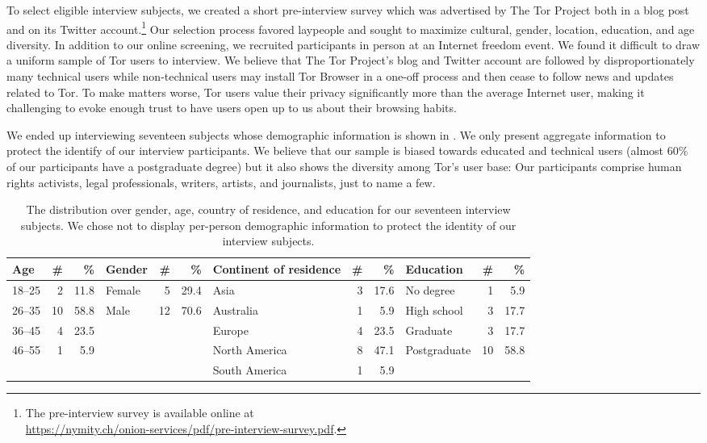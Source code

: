 To select eligible interview subjects, we created a short pre-interview survey
which was advertised by The Tor Project both in a blog post~\cite{Winter2017a}
and on its Twitter account.\footnote{The pre-interview survey is available
online at\\\url{https://nymity.ch/onion-services/pdf/pre-interview-survey.pdf}.}
Our selection process favored laypeople and sought to maximize cultural, gender,
location, education, and age diversity.  In addition to our online screening, we
recruited participants in person at an Internet freedom event.  We found it
difficult to draw a uniform sample of Tor users to interview. We believe that
The Tor Project's blog and Twitter account are followed by disproportionately
many technical users while non-technical users may install Tor Browser in a
one-off process and then cease to follow news and updates related to Tor.  To
make matters worse, Tor users value their privacy significantly more than the
average Internet user, making it challenging to evoke enough trust to have users
open up to us about their browsing habits.

We ended up interviewing seventeen subjects whose demographic information is
shown in .  We only present aggregate information to
protect the identify of our interview participants.  We believe that our sample
is biased towards educated and technical users (almost 60\% of our participants
have a postgraduate degree) but it also shows the diversity among Tor's user
base: Our participants comprise human rights activists, legal professionals,
writers, artists, and journalists, just to name a few.

\begin{table*}[ht]
	\centering
	\caption{The distribution over gender, age, country of residence, and
	education for our seventeen interview subjects.  We chose not to display
	per-person demographic information to protect the identity of our interview
	subjects.}
	\label{tab:interviewees}
	\begin{tabular}{l r r | l r r | l r r | l r r}
	\toprule
	Age & \# & \% &
	Gender & \# & \% &
	Continent of residence & \# & \% &
	Education & \# & \% \\
	\midrule
	18--25 & 2  & 11.8 & Female & 5  & 29.4 & Asia          & 3 & 17.6 & No degree    & 1  & 5.9 \\
	26--35 & 10 & 58.8 & Male   & 12 & 70.6 & Australia     & 1 &  5.9 & High school  & 3  & 17.7 \\
	36--45 & 4  & 23.5 &        &    &      & Europe        & 4 & 23.5 & Graduate     & 3  & 17.7 \\
	46--55 & 1  & 5.9  &        &    &      & North America & 8 & 47.1 & Postgraduate & 10 & 58.8 \\
	       &    &      &        &    &      & South America & 1 &  5.9 & & & \\
	\bottomrule
	\end{tabular}
\end{table*}


